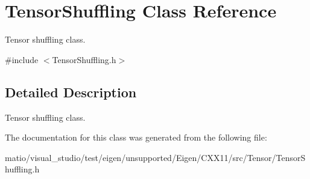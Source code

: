 \hypertarget{class_tensor_shuffling}{}\section{Tensor\+Shuffling Class Reference}
\label{class_tensor_shuffling}


Tensor shuffling class.  




{\ttfamily \#include $<$Tensor\+Shuffling.\+h$>$}



\subsection{Detailed Description}
Tensor shuffling class. 

The documentation for this class was generated from the following file\+:\begin{DoxyCompactItemize}
\item 
matio/visual\+\_\+studio/test/eigen/unsupported/\+Eigen/\+C\+X\+X11/src/\+Tensor/\+Tensor\+Shuffling.\+h\end{DoxyCompactItemize}
